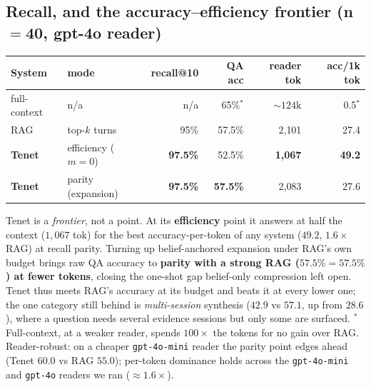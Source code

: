 \documentclass[11pt]{article}
\begin{document}
\subsection{Recall, and the accuracy--efficiency frontier (n$=$40, gpt-4o reader)}
\label{sec:frontier}
\begin{center}\small
\begin{tabular}{llrrrr}
\toprule
System & mode & recall@10 & QA acc & reader tok & \textbf{acc/1k tok} \\
\midrule
full-context & n/a & n/a & 65\%$^{*}$ & ${\sim}124\text{k}$ & 0.5$^{*}$ \\
RAG & top-$k$ turns & 95\% & 57.5\% & 2{,}101 & 27.4 \\
\textbf{Tenet} & efficiency ($m{=}0$) & \textbf{97.5\%} & 52.5\% & \textbf{1{,}067} & \textbf{49.2} \\
\textbf{Tenet} & parity (expansion) & \textbf{97.5\%} & \textbf{57.5\%} & 2{,}083 & 27.6 \\
\bottomrule
\end{tabular}
\end{center}
Tenet is a \emph{frontier}, not a point. At its \textbf{efficiency} point it answers at half
the context ($1{,}067$ tok) for the best accuracy-per-token of any system ($49.2$, $1.6\times$
RAG) at recall parity. Turning up belief-anchored expansion under RAG's own budget brings raw
QA accuracy to \textbf{parity with a strong RAG ($57.5\%{=}57.5\%$) at fewer tokens}, closing
the one-shot gap belief-only compression left open. Tenet thus meets RAG's accuracy at its
budget and beats it at every lower one; the one category still behind is \emph{multi-session}
synthesis ($42.9$ vs $57.1$, up from $28.6$), where a question needs several evidence sessions
but only some are surfaced. $^{*}$Full-context, at a weaker reader, spends $100\times$ the
tokens for no gain over RAG. Reader-robust: on a cheaper \texttt{gpt-4o-mini} reader the parity
point edges ahead (Tenet $60.0$ vs RAG $55.0$); per-token dominance holds across the
\texttt{gpt-4o-mini} and \texttt{gpt-4o} readers we ran ($\approx$$1.6\times$).
\end{document}
